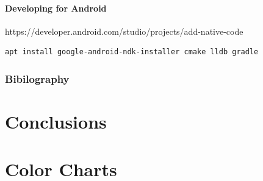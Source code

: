 \documentclass[a4paper, 11pt]{report}
\begin{document}
\hypertarget{developing-for-android-1}{%
\subsubsection{Developing for Android}\label{developing-for-android-1}}

https://developer.android.com/studio/projects/add-native-code

\begin{verbatim}
apt install google-android-ndk-installer cmake lldb gradle
\end{verbatim}

\hypertarget{bibilography-1}{%
\subsection{Bibilography}\label{bibilography-1}}

\chapter{Conclusions}




\appendix



\chapter{Color Charts}
\end{document}

